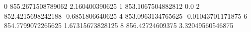 0 855.2671508789062 2.160400390625
1 853.1067504882812 0.0
2 852.4215698242188 -0.6851806640625
4 853.0963134765625 -0.01043701171875
6 854.7799072265625 1.67315673828125
8 856.42724609375 3.32049560546875
